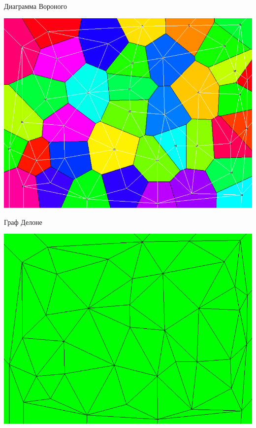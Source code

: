 \documentclass[14pt, fleqn, xcolor={dvipsnames, table}]{beamer}
\begin{document}
        \begin{frame}{Диаграмма Вороного}
            \begin{center}
	            \includegraphics[scale = 0.33]{voronoi-2.png}
	        \end{center}       
        \end{frame}
        
        \begin{frame}{Граф Делоне}
            \begin{center}
	            \includegraphics[scale = 0.33]{voronoi-3.png}
	        \end{center}       
        \end{frame}
        
\end{document}
